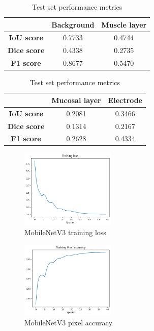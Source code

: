 \begin{table}[htbp]
    \centering
    \caption{Test set performance metrics}
    \label{tab:test-metrics}

    \begin{tabular}{|c|c|c|}
        \hline
        & \textbf{Background} & \textbf{Muscle layer} \\
        \hline
        \textbf{IoU score} & 0.7733 & 0.4744 \\
        \textbf{Dice score} & 0.4338 & 0.2735 \\
        \textbf{F1 score} & 0.8677 & 0.5470 \\
        \hline
    \end{tabular}

    \begin{tabular}{|c|c|c|}
        \hline
        & \textbf{Mucosal layer} & \textbf{Electrode} \\
        \hline
        \textbf{IoU score} & 0.2081 & 0.3466 \\
        \textbf{Dice score} & 0.1314 & 0.2167 \\
        \textbf{F1 score} & 0.2628 & 0.4334 \\
        \hline
    \end{tabular}

\end{table}

\begin{figure}[htp!]
    \centering
    \includegraphics[width=0.4\textwidth]{Images/loss.png}
    \caption{MobileNetV3 training loss}
    \label{fig:loss}
\end{figure}

\begin{figure}[htp!]
    \centering
    \includegraphics[width=0.4\textwidth]{Images/accuracy.png}
    \caption{MobileNetV3 pixel accuracy}
    \label{fig:accuracy}
\end{figure}

